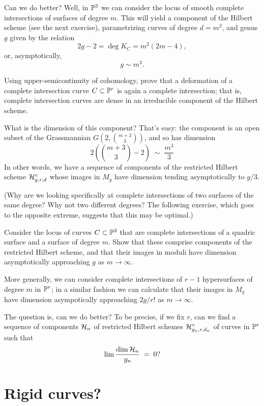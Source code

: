 Can we do better?  Well, in $\PP^3$ we can consider the locus of smooth complete intersections of surfaces of degree $m$. This will yield a component of the Hilbert scheme (see the next exercise), parametrizing curves of degree $d = m^2$, and genus $g$ given by the relation
$$
2g-2 = \deg K_C = m^2(2m-4),
$$
or, asymptotically,
$$
g \sim m^3.
$$

\begin{exercise}
Using upper-semicontinuity of cohomology, prove that a deformation of a complete intersection curve $C \subset \PP^r$ is again a complete intersection; that is, complete intersection curves are dense in an irreducible component of the Hilbert scheme.
\end{exercise} 

What is the dimension of this component? That's easy: the component is an open subset of the Grassmannian $G(2, \binom{m+3}{3})$, and so has dimension
$$
2(\binom{m+3}{3} - 2) \; \sim \; \frac{m^3}{3}
$$
In other words, we have a sequence of components of the restricted Hilbert scheme $\cH^\circ_{g,r,d}$ whose images in $M_g$ have dimension tending asymptotically to $g/3$.

(Why are we looking specifically at complete intersections of two surfaces of the same degree? Why not two different degrees? The following exercise, which goes to the opposite extreme, suggests that this may be optimal.)

\begin{exercise}
Consider the locus of curves $C \subset \PP^3$ that are complete intersections of a quadric surface and a surface of degree $m$. Show that these comprise components of the restricted Hilbert scheme, and that their images in moduli have dimension asymptotically approaching $g$ as $m \to \infty$.
\end{exercise}

More generally, we can consider complete intersections of $r-1$ hypersurfaces of degree $m$ in $\PP^r$; in a similar fashion we can calculate that their images in $M_g$ have dimension asympotically approaching $2g/r!$ as $m \to \infty$.

The question is, can we do better? To be precise, if we fix $r$, can we find a sequence of components $\cH_n$ of  restricted Hilbert schemes  $\cH^\circ_{g_n,r,d_n}$ of curves in $\PP^r$ such that
$$
\lim \frac{\dim \cH_n}{g_n} \; = \; 0?
$$

\section{Rigid curves?}

